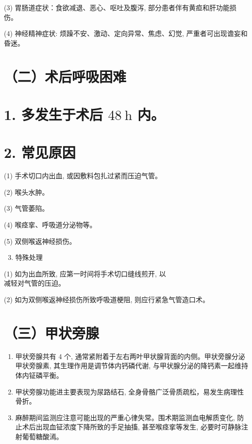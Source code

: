 \documentclass[10pt]{article}
\begin{document}
(3) 胃肠道症状：食欲减退、恶心、呕吐及腹泻, 部分患者伴有黄疸和肝功能损伤。

(4) 神经精神症状: 烦躁不安、激动、定向异常、焦虑、幻觉, 严重者可出现谵妄和昏迷。

\section*{（二）术后呼吸困难}
\section*{1. 多发生于术后 $48 \mathrm{~h}$ 内。}
\section*{2. 常见原因}
(1) 手术切口内出血, 或因敷料包扎过紧而压迫气管。

(2) 喉头水肿。

(3) 气管萎陷。

(4) 喉痉挛、呼吸道分泌物等。

(5) 双侧喉返神经损伤。

\begin{enumerate}
  \setcounter{enumi}{2}
  \item 特殊处理
\end{enumerate}

(1) 如为出血所致, 应第一时间将手术切口缝线煎开, 以\\
减轻对气管的压迫。

(2) 如为双侧喉返神经损伤所致呼吸道梗阻, 则应行紧急气管造口术。

\section*{（三）甲状旁腺}
\begin{enumerate}
  \item 甲状旁腺共有 4 个, 通常紧附着于左右两叶甲状腺背面的内侧。甲状旁腺分泌甲状旁腺素, 其生理作用是调节体内钙磷代谢, 与甲状腺分泌的降钙素一起维持体内钲磷平衡。

  \item 甲状旁腺功能进主要表现为尿路结石, 全身骨骼广泛骨质疏松，易发生病理性骨折。

  \item 麻醉期间监测应注意可能出现的严重心律失常。围术期监测血电解质变化, 防止术后出现血钲浓度下降所致的手足抽搐, 甚至喉痉挛等发生, 必要时可静脉注射葡萄糖酸漹。

\end{enumerate}
\end{document}

